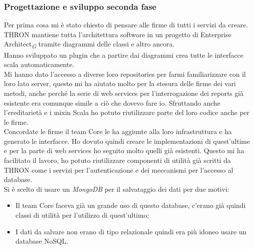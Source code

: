 \documentclass[a4paper, 12pt, twoside, openright]{book}
\newcommand{\gloss}[1]{#1\textsubscript{\textit{\tiny{G}}}}
\begin{document}
\subsubsection{Progettazione e sviluppo seconda fase}
Per prima cosa mi è stato chiesto di pensare alle firme di tutti i servizi da creare. THRON mantiene tutta l'architettura software in un progetto di \gloss{Enterprise Architect} tramite diagrammi delle classi e altro ancora.\\
Hanno sviluppato un plugin che a partire dai diagrammi crea tutte le interfacce scala automaticamente.\\
Mi hanno dato l'accesso a diverse loro repositories per farmi familiarizzare con il loro lato server, questo mi ha aiutato molto per la stesura delle firme dei vari metodi, anche perché la serie di web services per l'interrogazione dei reports già esistente era comunque simile a ciò che dovevo fare io. Sfruttando anche l'ereditarietà e i mixin Scala ho potuto riutilizzare parte del loro codice anche per le firme.\\

Concordate le firme il team Core le ha aggiunte alla loro infrastruttura e ha generato le interfacce. Ho dovuto quindi creare le implementazioni di quest'ultime e per la parte di web services ho seguito molto quelli già esistenti. Questo mi ha facilitato il lavoro, ho potuto riutilizzare componenti di utilità già scritti da THRON come i servizi per l'autenticazione e dei meccanismi per l'accesso al database.\\
Si è scelto di usare un \textit{MongoDB} per il salvataggio dei dati per due motivi:
\begin{itemize}
	\item Il team Core faceva già un grande uso di questo database, c'erano già quindi classi di utilità per l'utilizzo di quest'ultimo;
	\item I dati da salvare non erano di tipo relazionale quindi era più idoneo usare un database NoSQL.
\end{itemize}
\end{document}
